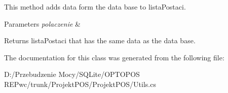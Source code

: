 This method adds data form the data base to lista\+Postaci. 


\begin{DoxyParams}{Parameters}
{\em polaczenie} & \\
\hline
\end{DoxyParams}
\begin{DoxyReturn}{Returns}
lista\+Postaci that has the same data as the data base.
\end{DoxyReturn}


The documentation for this class was generated from the following file\+:\begin{DoxyCompactItemize}
\item 
D\+:/\+Przebudzenie Mocy/\+S\+Q\+Lite/\+O\+P\+T\+O\+P\+O\+S R\+E\+Pwc/trunk/\+Projekt\+P\+O\+S/\+Projekt\+P\+O\+S/Utils.\+cs\end{DoxyCompactItemize}
